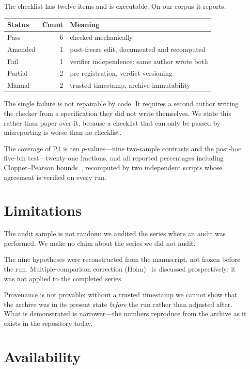 \documentclass[11pt]{article}
\begin{document}
The checklist has twelve items and is executable. On our corpus it reports:

\begin{center}
\begin{tabular}{@{}lrl@{}}
\toprule
Status & Count & Meaning \\
\midrule
Pass    & 6 & checked mechanically \\
Amended & 1 & post-freeze edit, documented and recomputed \\
Fail    & 1 & verifier independence: same author wrote both \\
Partial & 2 & pre-registration, verdict versioning \\
Manual  & 2 & trusted timestamp, archive immutability \\
\bottomrule
\end{tabular}
\end{center}

The single failure is not repairable by code. It requires a second author
writing the checker from a specification they did not write themselves. We state
this rather than paper over it, because a checklist that can only be passed by
misreporting is worse than no checklist.

The coverage of P4 is ten $p$-values---nine two-sample contrasts and the
post-hoc five-bin test---twenty-one fractions, and all reported
percentages including Clopper--Pearson bounds~\cite{clopper1934}, recomputed by
two independent scripts whose agreement is verified on every run.

\section{Limitations}

The audit sample is not random: we audited the series where an audit was
performed. We make no claim about the series we did not audit.

The nine hypotheses were reconstructed from the manuscript, not frozen before
the run. Multiple-comparison correction (Holm)~\cite{holm1979} is discussed prospectively; it
was not applied to the completed series.

Provenance is not provable: without a trusted timestamp we cannot show that the
archive was in its present state \emph{before} the run rather than adjusted
after. What is demonstrated is narrower---the numbers reproduce from the archive
as it exists in the repository today.

\section{Availability}
\end{document}
